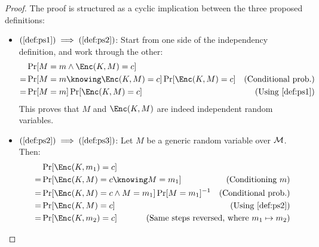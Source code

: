\begin{proof}
    The proof is structured as a cyclic implication between the three proposed definitions:
    
    \begin{itemize}
        \item $(\ref{def:ps1}) \implies (\ref{def:ps2})$: Start from one side of the independency definition, and work through the other:
        \begin{align*}
             & \Pr[M = m \wedge \Enc(K, M) = c]                         & \\
            =& \Pr[M = m \knowing \Enc(K, M) = c] \Pr[\Enc(K, M) = c]   & \text{(Conditional prob.)} \\
            =& \Pr[M = m] \Pr[\Enc(K, M) = c]                           & \text{(Using \ref{def:ps1})} \\
        \end{align*}
        This proves that $M$ and $\Enc(K, M)$ are indeed independent random variables.
        
        \item $(\ref{def:ps2}) \implies (\ref{def:ps3})$: Let $M$ be a generic random variable over $\mathcal{M}$. Then:
        \begin{align*}
             & \Pr[\Enc(K, m_1) = c]                                & \\
            =& \Pr[\Enc(K, M) = c \knowing M = m_1]                 & \text{(Conditioning $m$)} \\
            =& \Pr[\Enc(K, M) = c \wedge M = m_1] \Pr[M = m_1]^{-1} & \text{(Conditional prob.)} \\
            =& \Pr[\Enc(K, M) = c]                                  & \text{(Using \ref{def:ps2})} \\
            =& \Pr[\Enc(K, m_2) = c]                                & \mathllap{\text{(Same steps reversed, where $m_1 \mapsto m_2$)}} \\
        \end{align*}


\end{itemize}
\end{proof}
